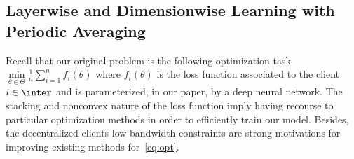 \documentclass[twoside]{article}
\begin{document}
\subsection{Layerwise and Dimensionwise Learning with Periodic Averaging}

Recall that our original problem is the following optimization task $\min \limits_{\theta \in \Theta} \frac{1}{n} \sum_{i=1}^n f_i(\theta)$ where $f_i(\theta)$ is the loss function associated to the client $i \in \inter$ and is parameterized, in our paper, by a deep neural network.
The stacking and nonconvex nature of the loss function imply having recourse to particular optimization methods in order to efficiently train our model.
Besides, the decentralized clients low-bandwidth constraints are strong motivations for improving existing methods for~\eqref{eq:opt}.  
\end{document}
